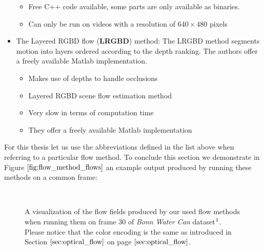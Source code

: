 \begin{itemize}
\begin{itemize}
	\item Free C++ code available, some parts are only available as binaries.
	\item Can only be run on videos with a resolution of $640 \times 480$ pixels
	\end{itemize}	
\item The Layered RGBD flow (\textbf{LRGBD}) method: The LRGBD method segments motion into layers ordered according to the depth ranking. The authors offer a freely available Matlab implementation.
	\begin{itemize}
	\item Makes use of depths to handle occlusions
	\item Layered RGBD scene flow estimation method
	\item Very slow in terms of computation time
	\item They offer a freely available Matlab implementation
	\end{itemize}
\end{itemize}
For this thesis let us use the abbreviations defined in the list above when referring to a particular flow method. To conclude this section we demonstrate in Figure $\ref{fig:flow_method_flows}$ an example output produced by running these methods on a common frame:
\begin{figure}[H]
\begin{center}
~
~
\end{center}
\caption[Flow Fields]{A visualization of the flow fields produced by our used flow methods when running them on frame 30 of \textit{Bonn Water Can} dataset$\footnotemark$. Please notice that the color encoding is the same as introduced in Section $\ref{sec:optical_flow}$ on page $\pageref{sec:optical_flow}$.}
\label{fig:flow_method_flows}
\end{figure}

